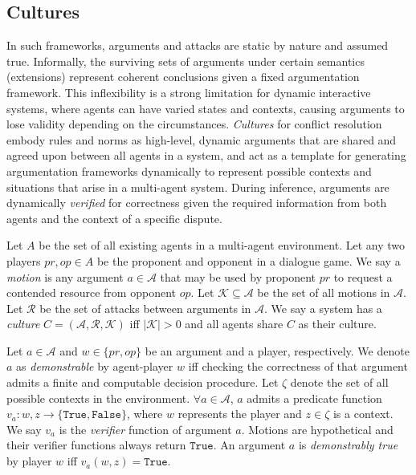 \documentclass[acmsmall]{custom-arxiv}  %
\begin{document}
\subsection{Cultures}
\label{section:cultures}
In such frameworks, arguments and attacks are static by nature and assumed true. Informally, the surviving sets of arguments under certain semantics (extensions) represent coherent conclusions given a fixed argumentation framework. This inflexibility is a strong limitation for dynamic interactive systems, where agents can have varied states and contexts, causing arguments to lose validity depending on the circumstances. \textit{Cultures} for conflict resolution \citep{Raymond2020Culture-BasedDeconfliction} embody rules and norms as high-level, dynamic arguments that are shared and agreed upon between all agents in a system, and act as a template for generating argumentation frameworks dynamically to represent possible contexts and situations that arise in a multi-agent system. During inference, arguments are dynamically \textit{verified} for correctness given the required information from both agents and the context of a specific dispute.

\begin{definition} [Culture]
\label{definition:culture}
Let $A$ be the set of all existing agents in a multi-agent environment. Let any two players $pr, op \in A$ be the proponent and opponent in a dialogue game. We say a \textit{motion} is any argument $a \in \mathcal{A}$ that may be used by proponent $pr$ to request a contended resource from opponent $op$. Let $\mathcal{K} \subseteq \mathcal{A}$ be the set of all motions in $\mathcal{A}$. Let $\mathcal{R}$ be the set of attacks between arguments in $\mathcal{A}$. We say a system has a \textit{culture} $C = (\mathcal{A}, \mathcal{R}, \mathcal{K})$ iff $|\mathcal{K}| > 0 $ and all agents share $C$ as their culture.
\end{definition}

\begin{definition} 
Let $a \in \mathcal{A}$ and $w \in \{pr,op\}$ be an argument and a player, respectively. We denote $a$ as \textit{demonstrable} by agent-player $w$ iff checking the correctness of that argument admits a finite and computable decision procedure. Let $\zeta$ denote the set of all possible contexts in the environment. $\forall a \in \mathcal{A}$, $a$ admits a predicate function $v_a: w, z \rightarrow \{\texttt{True}, \texttt{False}\}$, where $w$ represents the player and $z \in \zeta$ is a context. We say $v_a$ is the \textit{verifier} function of argument $a$. Motions are hypothetical and their verifier functions always return $\texttt{True}$. An argument $a$ is \textit{demonstrably true} by player $w$ iff $v_a(w, z) = \texttt{True}$.
\end{definition}
\end{document}

